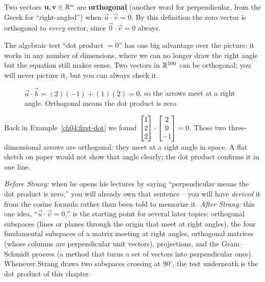 \begin{definition}\label{ch04:orthogonal}
Two vectors $\mathbf{u}, \mathbf{v}\in\mathbb{R}^n$ are \textbf{orthogonal} (another word for
perpendicular, from the Greek for ``right-angled'') when $\vec u\cdot\vec v = 0$.
By this definition the zero vector is
orthogonal to \emph{every} vector, since $\vec 0\cdot\vec v = 0$ always.
\end{definition}

The algebraic test ``dot product $=0$'' has one big advantage over the picture: it
works in any number of dimensions, where we can no longer draw the right angle but
the equation still makes sense. Two vectors in $\mathbb{R}^{100}$ can be orthogonal; you
will never picture it, but you can always check it.

\begin{figure}[htbp]
\centering
{}
\caption{$\vec a\cdot\vec b = (2)(-1)+(1)(2) = 0$, so the arrows meet at a right
angle. Orthogonal means the dot product is zero.}
\label{ch04:perp}
\end{figure}

\begin{example}
Back in Example~\ref{ch04:first-dot} we found
$\begin{bmatrix}1\\2\\2\end{bmatrix}\cdot\begin{bmatrix}2\\0\\-1\end{bmatrix}=0$. Those two three-dimensional arrows are
orthogonal: they meet at a right angle in space. A flat sketch on paper would not
show that angle clearly; the dot product confirms it in one line.
\end{example}

\begin{strangbox}
\emph{Before Strang:} when he opens his lectures by saying ``perpendicular means
the dot product is zero,'' you will already own that sentence -- you will have
\emph{derived} it from the cosine formula rather than been told to memorize it.
\emph{After Strang:} this one idea, ``$\vec u\cdot\vec v=0$,'' is the starting
point for several later topics: orthogonal subspaces (lines or planes through the
origin that meet at right angles), the four fundamental subspaces of a matrix
meeting at right angles, orthogonal matrices (whose columns are perpendicular unit
vectors), projections, and the Gram--Schmidt process (a method that turns a set of
vectors into perpendicular ones). Whenever Strang draws two subspaces crossing at
$90^\circ$, the test underneath is the dot product of this chapter.
\end{strangbox}


